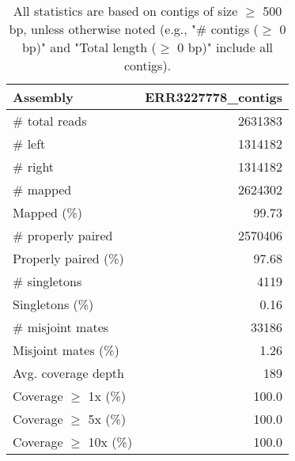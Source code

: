 \documentclass[12pt,a4paper]{article}
\begin{document}
\begin{table}[ht]
\begin{center}
\caption{All statistics are based on contigs of size $\geq$ 500 bp, unless otherwise noted (e.g., "\# contigs ($\geq$ 0 bp)" and "Total length ($\geq$ 0 bp)" include all contigs).}
\begin{tabular}{|l*{1}{|r}|}
\hline
Assembly & ERR3227778\_contigs \\ \hline
\# total reads & 2631383 \\ \hline
\# left & 1314182 \\ \hline
\# right & 1314182 \\ \hline
\# mapped & 2624302 \\ \hline
Mapped (\%) & 99.73 \\ \hline
\# properly paired & 2570406 \\ \hline
Properly paired (\%) & 97.68 \\ \hline
\# singletons & 4119 \\ \hline
Singletons (\%) & 0.16 \\ \hline
\# misjoint mates & 33186 \\ \hline
Misjoint mates (\%) & 1.26 \\ \hline
Avg. coverage depth & 189 \\ \hline
Coverage $\geq$ 1x (\%) & 100.0 \\ \hline
Coverage $\geq$ 5x (\%) & 100.0 \\ \hline
Coverage $\geq$ 10x (\%) & 100.0 \\ \hline
\end{tabular}
\end{center}
\end{table}
\end{document}
